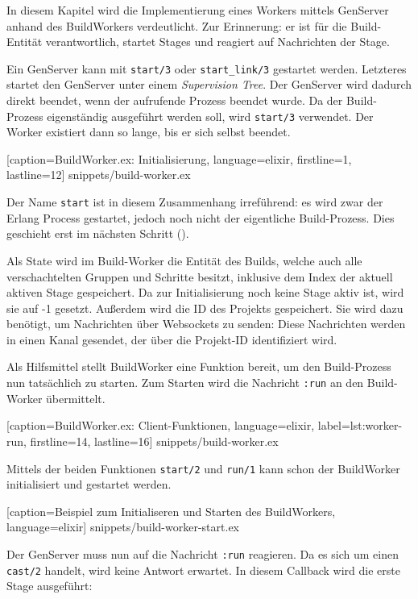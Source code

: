 In diesem Kapitel wird die Implementierung eines Workers mittels GenServer anhand des BuildWorkers verdeutlicht. Zur Erinnerung: er ist für die Build-Entität verantwortlich, startet Stages und reagiert auf Nachrichten der Stage.

Ein GenServer kann mit \texttt{start/3} oder \texttt{start\_link/3} gestartet werden. Letzteres startet den GenServer unter einem \emph{Supervision Tree}. Der GenServer wird dadurch direkt beendet, wenn der aufrufende Prozess beendet wurde. Da der Build-Prozess eigenständig ausgeführt werden soll, wird \texttt{start/3} verwendet. Der Worker existiert dann so lange, bis er sich selbst beendet.


  [caption={BuildWorker.ex: Initialisierung},
  language=elixir,
  firstline=1,
  lastline=12]
  {snippets/build-worker.ex}

Der Name \texttt{start} ist in diesem Zusammenhang irreführend: es wird zwar der Erlang Process gestartet, jedoch noch nicht der eigentliche Build-Prozess. Dies geschieht erst im nächsten Schritt ().

Als State wird im Build-Worker die Entität des Builds, welche auch alle verschachtelten Gruppen und Schritte besitzt, inklusive dem Index der aktuell aktiven Stage gespeichert. Da zur Initialisierung noch keine Stage aktiv ist, wird sie auf -1 gesetzt. Außerdem wird die ID des Projekts gespeichert. Sie wird dazu benötigt, um Nachrichten über Websockets zu senden: Diese Nachrichten werden in einen Kanal gesendet, der über die Projekt-ID identifiziert wird.

Als Hilfsmittel stellt BuildWorker eine Funktion bereit, um den Build-Prozess nun tatsächlich zu starten. Zum Starten wird die Nachricht \texttt{:run} an den Build-Worker übermittelt.


  [caption={BuildWorker.ex: Client-Funktionen},
  language=elixir,
  label={lst:worker-run},
  firstline=14,
  lastline=16]
  {snippets/build-worker.ex}

Mittels der beiden Funktionen \texttt{start/2} und \texttt{run/1} kann schon der BuildWorker initialisiert und gestartet werden.


  [caption={Beispiel zum Initialiseren und Starten des BuildWorkers},
  language=elixir]
  {snippets/build-worker-start.ex}

Der GenServer muss nun auf die Nachricht \texttt{:run} reagieren. Da es sich um einen \texttt{cast/2} handelt, wird keine Antwort erwartet. In diesem Callback wird die erste Stage ausgeführt:

